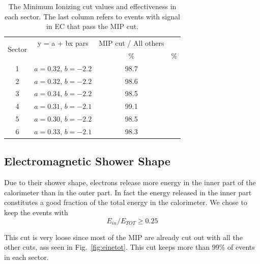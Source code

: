 \begin{table}[ht]
\label{tab:EoEi}
	\begin{center}
		\begin{tabular}{c | c | c | c}
			\hline 
			\multirow{2}{*}{Sector} 
					& y = a + bx pars & MIP cut / All others \\
					&   & \% & \% \\
			\hline
			1    & $a=0.32$, $b=-2.2$ & 98.7 \\
			2    & $a=0.32$, $b=-2.2$ & 98.6 \\
			3    & $a=0.34$, $b=-2.2$ & 98.5 \\
			4    & $a=0.31$, $b=-2.1$ &  99.1 \\
			5    & $a=0.30$, $b=-2.2$ &  98.5 \\
			6    & $a=0.33$, $b=-2.1$ &  98.3 \\
			\hline
		\end{tabular}
		\caption{The Minimum Ionizing cut values and effectiveness in each sector.
					The last column refers to events with signal in EC that pass the MIP cut.}	
	\end{center}
\end{table}





\subsection{Electromagnetic Shower Shape}
Due to their shower shape, electrons release more energy in 
the inner part of the calorimeter than in the outer part. In
fact the energy released in the inner part constitutes a good
fraction of the total energy in the calorimeter.
We chose to keep the events with $$E_{in}/E_{TOT} \geq 0.25$$

This cut is very loose since most of the MIP are already cut
out with all the other cuts, ass seen in Fig.~\ref{fig:einetot}.
This cut keeps more than $99\%$ of events in each sector.


